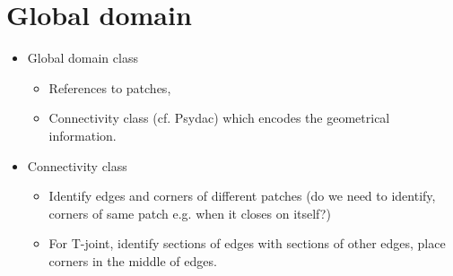 \documentclass[presentation.tex]{subfiles}
\begin{document}
\section{Global domain}
\begin{itemize}
    \item Global domain class
    \begin{itemize}
        \item References to patches,
        \item Connectivity class (cf. Psydac) which encodes the geometrical information.
    \end{itemize}
    \item Connectivity class
    \begin{itemize}
        \item Identify edges and corners of different patches (do we need to identify,
                corners of same patch e.g. when it closes on itself?)
        \item For T-joint, identify sections of edges with sections of other edges, 
                place corners in the middle of edges.
    \end{itemize}
    
\end{itemize}
\end{document}
